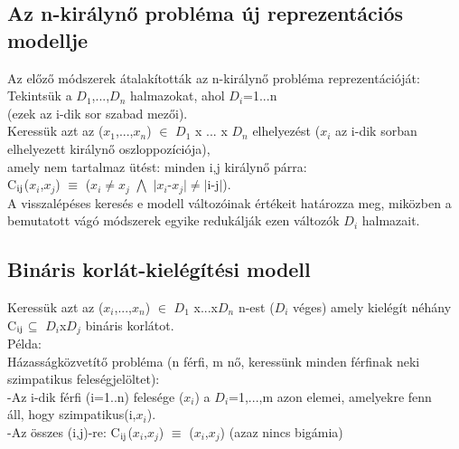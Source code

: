 \documentclass{article}
\begin{document}
	 \subsection{Az n-királynő probléma új reprezentációs modellje}
	 Az előző módszerek átalakították az n-királynő probléma reprezentációját:\\
	 \hspace*{1em} Tekintsük a $D_1$,...,$D_n$ halmazokat, ahol $D_i$={1...n} \\
	 \hspace*{1em} (ezek az i-dik sor szabad mezői).\\
	 \hspace*{1em} Keressük azt az ($x_1$,...,$x_n$) $\in$ $D_1$ x ... x $D_n$ elhelyezést ($x_i$ az i-dik sorban\\
	 \hspace*{1em} elhelyezett királynő oszloppozíciója),\\
	 \hspace*{1em} amely nem tartalmaz ütést: minden i,j királynő párra:\\
	 \hspace*{1em} C$\textsubscript{ij}$($x_i$,$x_j$) $\equiv$ ($x_i$$\neq$$x_j$ $\bigwedge$ $|$$x_i$-$x_j$$|$$\neq$$|$i-j$|$).\\
	 A visszalépéses keresés e modell változóinak értékeit határozza meg, miközben a bemutatott vágó módszerek egyike redukálják ezen változók $D_i$ halmazait.
	 
	 \subsection{Bináris korlát-kielégítési modell}
	 Keressük azt az ($x_i$,...,$x_n$) $\in$ $D_1$ x...x$D_n$ n-est ($D_i$ véges) amely kielégít néhány C$\textsubscript{ij}$$\subseteq$ $D_i$x$D_j$ bináris korlátot.\\
	 Példa:\\
	 Házasságközvetítő probléma (n férfi, m nő, keressünk minden férfinak neki szimpatikus feleségjelöltet):\\
	 \hspace*{1em} -Az i-dik férfi (i=1..n) felesége ($x_i$) a $D_i$={1,...,m} azon elemei, amelyekre fenn \\
	 \hspace*{2em} áll, hogy szimpatikus(i,$x_i$).\\
	 \hspace*{1em} -Az összes (i,j)-re: C$\textsubscript{ij}$($x_i$,$x_j$) $\equiv$ ($x_i$,$x_j$) (azaz nincs bigámia)
	 
\end{document}
